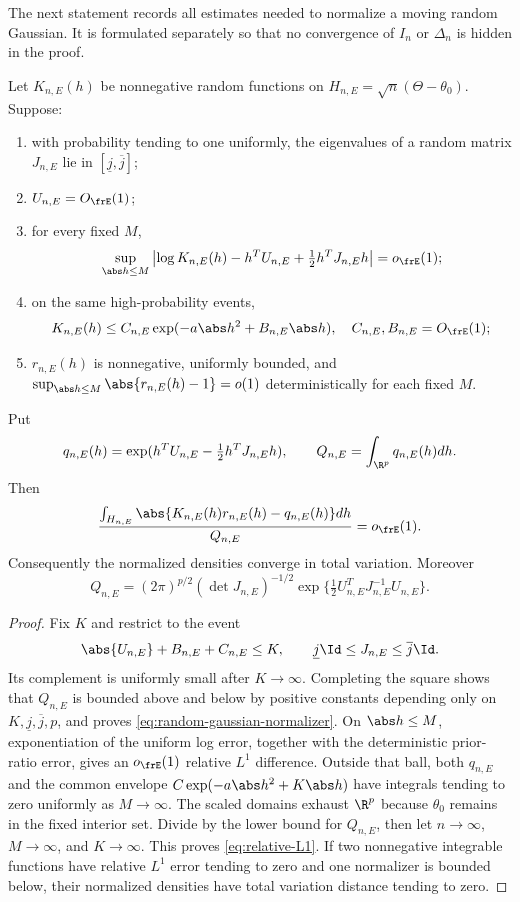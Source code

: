 The next statement records all estimates needed to normalize a moving random
Gaussian.  It is formulated separately so that no convergence of \(I_n\) or
\(\Delta_n\) is hidden in the proof.

\begin{lemma}
\label{lem:random-laplace}
Let \(K_{n,E}(h)\) be nonnegative random functions on
\(H_{n,E}=\sqrt n(\Theta-\theta_0)\).  Suppose:
\begin{enumerate}
\item with probability tending to one uniformly, the eigenvalues of a random
matrix \(J_{n,E}\) lie in \([\underline j,\overline j]\);
\item \(U_{n,E}=O_{\frE}(1)\);
\item for every fixed \(M\),
\[
 \sup_{\abs h\le M}\left|
 \log K_{n,E}(h)-h^TU_{n,E}+\tfrac12h^TJ_{n,E}h
 \right|=o_{\frE}(1);
\]
\item on the same high-probability events,
\[
 K_{n,E}(h)\le
 C_{n,E}\exp(-a\abs h^2+B_{n,E}\abs h),
 \quad C_{n,E},B_{n,E}=O_{\frE}(1);
\]
\item \(r_{n,E}(h)\) is nonnegative, uniformly bounded, and
\(\sup_{\abs h\le M}\abs{r_{n,E}(h)-1}=o(1)\) deterministically for each
fixed \(M\).
\end{enumerate}
Put
\[
 q_{n,E}(h)=\exp(h^TU_{n,E}-\tfrac12h^TJ_{n,E}h),
 \qquad
 Q_{n,E}=\int_{\R^p}q_{n,E}(h)dh.
\]
Then
\begin{equation}
 \frac{\int_{H_{n,E}}
 \abs{K_{n,E}(h)r_{n,E}(h)-q_{n,E}(h)}dh}
 {Q_{n,E}}=o_{\frE}(1).
 \label{eq:relative-L1}
\end{equation}
Consequently the normalized densities converge in total variation.  Moreover
\begin{equation}
 Q_{n,E}=(2\pi)^{p/2}(\det J_{n,E})^{-1/2}
 \exp\{\tfrac12U_{n,E}^TJ_{n,E}^{-1}U_{n,E}\}.
 \label{eq:random-gaussian-normalizer}
\end{equation}
\end{lemma}

\begin{proof}
Fix \(K\) and restrict to the event
\[
 \abs{U_{n,E}}+B_{n,E}+C_{n,E}\le K,
 \qquad
 \underline j\Id\le J_{n,E}\le\overline j\Id.
\]
Its complement is uniformly small after \(K\to\infty\).  Completing the
square shows that \(Q_{n,E}\) is bounded above and below by positive
constants depending only on \(K,\underline j,\overline j,p\), and proves
\eqref{eq:random-gaussian-normalizer}.  On \(\abs h\le M\), exponentiation of
the uniform log error, together with the deterministic prior-ratio error,
gives an \(o_{\frE}(1)\) relative \(L^1\) difference.  Outside that ball,
both \(q_{n,E}\) and the common envelope
\(C\exp(-a\abs h^2+K\abs h)\) have integrals tending to zero uniformly as
\(M\to\infty\).  The scaled domains exhaust \(\R^p\) because
\(\theta_0\) remains in the fixed interior set.  Divide by the lower bound
for \(Q_{n,E}\), then let \(n\to\infty\), \(M\to\infty\), and
\(K\to\infty\).  This proves \eqref{eq:relative-L1}.  If two nonnegative
integrable functions have relative \(L^1\) error tending to zero and one
normalizer is bounded below, their normalized densities have total variation
distance tending to zero.
\end{proof}

